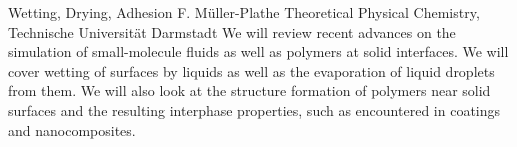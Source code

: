 
    \begin{abstract_online}{Wetting, Drying, Adhesion}{%
        F. Müller-Plathe}{%
        \KLtag}{%
        Theoretical Physical Chemistry, Technische Universität Darmstadt}
    We will review recent advances on the simulation of small-molecule  fluids as well as polymers at solid interfaces. We will cover wetting of surfaces by liquids as well as the evaporation of liquid droplets from  them. We will also look at the structure formation of polymers near  solid surfaces and the resulting interphase properties, such as  encountered in coatings and nanocomposites.  
    
    \end{abstract_online}
    